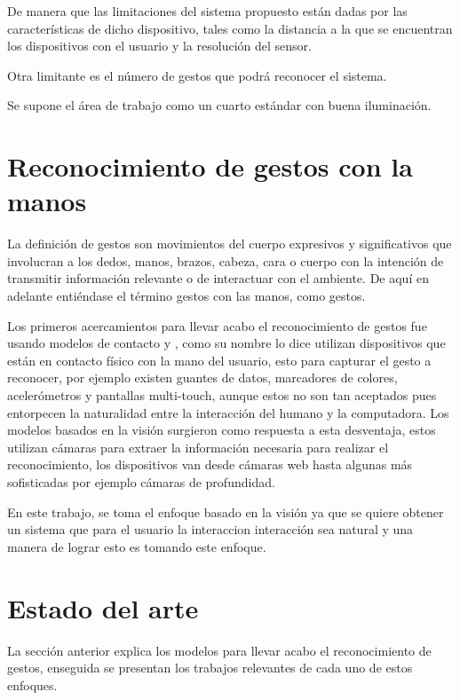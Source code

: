 De  manera que las limitaciones del sistema propuesto están dadas por las características de dicho dispositivo, tales como la distancia  a la que se encuentran los dispositivos con el usuario y la resolución del sensor. 

Otra limitante es el número de gestos que podrá reconocer el sistema.

Se supone el área de trabajo como un cuarto estándar con buena iluminación.




\section{Reconocimiento de gestos con la manos}\label{sec:ReconocimientoGestos} 

La definición de gestos \citep{Mitra2007} son movimientos del cuerpo expresivos y significativos que involucran a los dedos, manos, brazos, cabeza, cara o cuerpo con la intención de transmitir información relevante o de interactuar con el ambiente. De aquí en adelante entiéndase el término gestos con las manos, como gestos. 

Los primeros acercamientos para llevar acabo el reconocimiento de gestos fue usando modelos de contacto \citep{Rautaray2012} y \citep{Nayakwadi2014}, como su nombre lo dice utilizan dispositivos que est\'an en contacto f\'isico con la mano del usuario, esto para capturar el gesto a reconocer, por ejemplo existen guantes de datos, marcadores de colores, acelerómetros y pantallas multi-touch, aunque estos no son tan aceptados pues entorpecen la naturalidad entre la interacción del humano y la computadora. Los modelos basados en la visi\'on surgieron como respuesta a esta desventaja, estos utilizan cámaras para extraer la información necesaria para realizar el reconocimiento, los dispositivos van desde c\'amaras web hasta algunas más sofisticadas por ejemplo c\'amaras de profundidad.  

En este trabajo, se toma el enfoque basado en la visi\'on ya que se quiere obtener un sistema que para el usuario la interaccion interacción sea natural y una manera de lograr esto es tomando este enfoque.  



\section{Estado del arte}\label{sec:EstadoDelArte} 

La sección anterior explica los modelos para llevar acabo el reconocimiento de gestos, enseguida se presentan los trabajos relevantes de cada uno de estos enfoques. 

